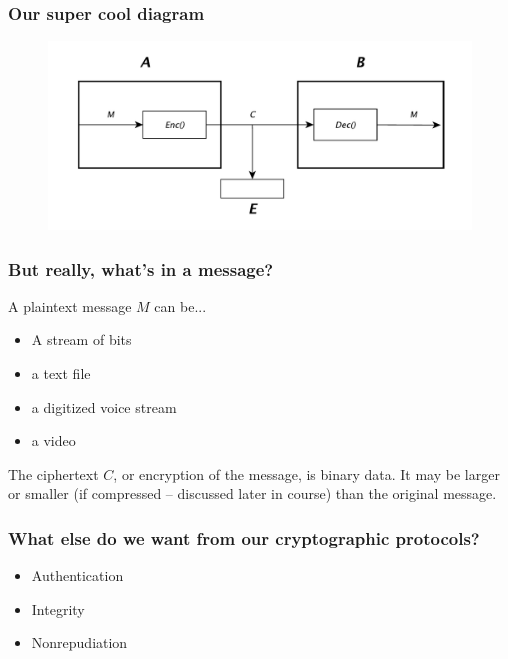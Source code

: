 \documentclass{beamer}
\newcommand{\<}{\langle}
\renewcommand{\>}{\rangle}
\begin{document}
\begin{frame}
\frametitle{Our super cool diagram}

\begin{figure}
\includegraphics[scale=.5]{IMG/diag5.pdf}
\end{figure}
\end{frame}

\begin{frame}
\frametitle{But really, what's in a message?}

A plaintext message $M$  can be...

\begin{itemize}
\item A stream of bits
\item a text file
\item a digitized voice stream
\item a video
\end{itemize}

The ciphertext $C$, or encryption of the message, is binary data. It may be larger or smaller (if compressed -- discussed later in course) than the original message. 
\end{frame}





\begin{frame}
\frametitle{What else do we want from our cryptographic protocols?}

\begin{itemize}
\item Authentication
\item Integrity
\item Nonrepudiation 
\end{itemize}
\end{frame}
\end{document}
